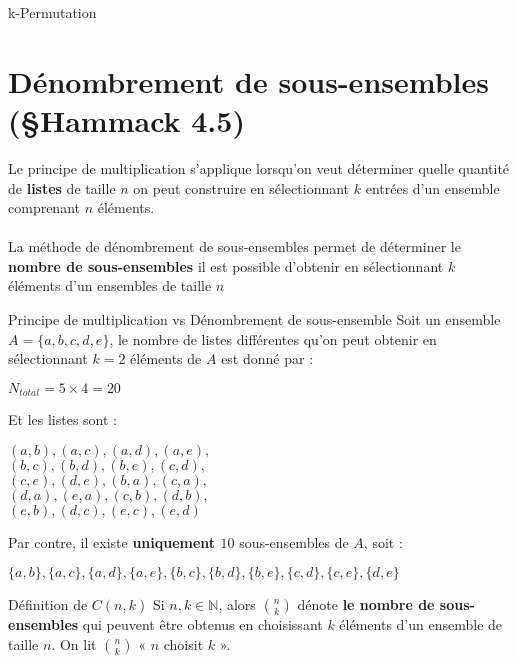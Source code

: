 \documentclass[8pt]{report}
\begin{document}
\begin{multicols*}{2}
\begin{Definitionx*}{{k-Permutation}}{}
\end{Definitionx*}

\section{Dénombrement de sous-ensembles (\S Hammack 4.5)}

\begin{note}{}{}
    Le \textcolor{myb}{principe de multiplication} s'applique lorsqu'on veut déterminer quelle quantité 
    de \textbf{listes} de taille $n$ on peut construire en sélectionnant $k$ entrées d'un 
    ensemble comprenant $n$ éléments. \\\\ 

    La méthode de  \textcolor{myb}{dénombrement de sous-ensembles} permet de déterminer 
    le \textbf{nombre de sous-ensembles} il est possible d'obtenir en sélectionnant $k$ 
    éléments d'un ensembles de taille $n$
\end{note}

\begin{EExample}{Principe de multiplication vs Dénombrement de sous-ensemble}{}
  Soit un ensemble $A = \{a, b, c, d, e\}$, le nombre de listes différentes qu'on peut 
  obtenir en sélectionnant $k = 2$ éléments de $A$ est donné par : 
  \begin{center}
      $N_{total} = 5 \times 4 = 20$
  \end{center}
  Et les listes sont : 
  \begin{center}
  $(a, b), (a, c), (a, d), (a, e),$ \\ 
  $(b, c), (b, d), (b, e), (c, d),$ \\ 
  $(c, e), (d, e), (b, a), (c, a),$\\ 
  $(d, a), (e, a), (c, b), (d, b),$\\ 
  $(e, b), (d, c), (e, c), (e, d)$
  \end{center}
  Par contre, il existe \textbf{uniquement $10$}   sous-ensembles de $A$, soit :
  \begin{center}
    $\{a, b\}, \{a, c\}, \{a, d\}, \{a, e\}, \{b, c\}, \{b, d\}, \{b, e\}, \{c, d\}, \{c, e\}, \{d, e\}$
  \end{center}
\end{EExample}

\begin{Definition}{Définition de $C(n, k)$}{}
  Si $n, k \in \mathbb{N}$, alors ${n \choose k}$ dénote \textbf{le nombre de sous-ensembles}   qui peuvent être obtenus en choisissant $k$ éléments d'un ensemble de taille $n$. On lit ${n \choose k}$ « $n$ choisit $k$ ». 
\end{Definition}


\end{multicols*}
\end{document}
